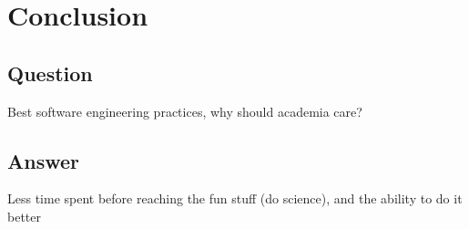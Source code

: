\documentclass[usenames,dvipsnames]{beamer}
\theoremstyle{plain}
\theoremstyle{definition}
\begin{document}
\begin{frame}{\setframetitle{}}

 \begin{figure}
         {}
 \end{figure}

\end{frame}


\begin{frame}{\setframetitle{}}

 \begin{figure}
         {}
 \end{figure}

\end{frame}


\section{Conclusion}
\subsection{Question}


\begin{frame}{\setframetitle{}}
  {
\centering


\Large  Best software engineering practices, why should
academia care?

}
\end{frame}

\subsection{Answer}


\begin{frame}{\setframetitle{}}
  {
\centering
\Large  Less time spent before reaching the fun stuff (do science), and the ability to do
it better
}
\end{frame}
\end{document}
